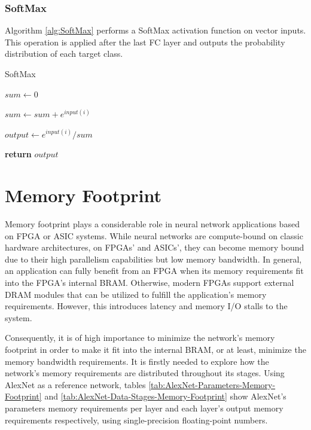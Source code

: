 \subsubsection{SoftMax}
Algorithm \ref{alg:SoftMax} performs a SoftMax activation function on vector inputs. This operation is applied after the last FC layer and outputs the probability distribution of each target class.

\begin{algorithm}[H]
	\caption{SoftMax}\label{alg:SoftMax}
	\begin{algorithmic}[1]
			\State $sum \gets 0$

				\State $sum \gets sum + e^{input(i)}$
			\EndFor

				\State $output \gets e^{input(i)} / sum$
			\EndFor

			\State \textbf{return} $output$
		\EndProcedure
	\end{algorithmic}
\end{algorithm}

\section{Memory Footprint}
\label{sec:Memory-Footprint}
Memory footprint plays a considerable role in neural network applications based on FPGA or ASIC systems. While neural networks are compute-bound on classic hardware architectures, on FPGAs' and ASICs', they can become memory bound due to their high parallelism capabilities but low memory bandwidth. In general, an application can fully benefit from an FPGA when its memory requirements fit into the FPGA's internal BRAM. Otherwise, modern FPGAs support external DRAM modules that can be utilized to fulfill the application's memory requirements. However, this introduces latency and memory I/O stalls to the system.

Consequently, it is of high importance to minimize the network's memory footprint in order to make it fit into the internal BRAM, or at least, minimize the memory bandwidth requirements. It is firstly needed to explore how the network's memory requirements are distributed throughout its stages. Using AlexNet as a reference network, tables \ref{tab:AlexNet-Parameters-Memory-Footprint} and \ref{tab:AlexNet-Data-Stages-Memory-Footprint} show AlexNet's parameters memory requirements per layer and each layer's output memory requirements respectively, using single-precision floating-point numbers.

